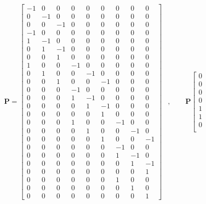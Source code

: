 \begin{align*}
   \begin{array}{ll}	
	\mathbf{P} = \left[ \begin{array}{ccccccccc}
	 -1 & 0 & 0 & 0 & 0 & 0 & 0 & 0 & 0 \\
	 0 & -1 & 0 & 0 & 0 & 0 & 0 & 0 & 0 \\	 
	 0 & 0 & -1 & 0 & 0 & 0 & 0 & 0 & 0 \\	 
	 -1 & 0 & 0 & 0 & 0 & 0 & 0 & 0 & 0 \\	 
	 1 & -1 & 0 & 0 & 0 & 0 & 0 & 0 & 0 \\	 
	 0 & 1 & -1 & 0 & 0 & 0 & 0 & 0 & 0 \\	 
	 0 & 0 & 1 & 0 & 0 & 0 & 0 & 0 & 0 \\	 
	 1 & 0 & 0 & -1 & 0 & 0 & 0 & 0 & 0 \\	 
	 0 & 1 & 0 & 0 & -1 & 0 & 0 & 0 & 0 \\	 
	 0 & 0 & 1 & 0 & 0 & -1 & 0 & 0 & 0 \\	 
	 0 & 0 & 0 & -1 & 0 & 0 & 0 & 0 & 0 \\	 
	 0 & 0 & 0 & 1 & -1 & 0 & 0 & 0 & 0 \\	 
	 0 & 0 & 0 & 0 & 1 & -1 & 0 & 0 & 0 \\	 
	 0 & 0 & 0 & 0 & 0 & 1 & 0 & 0 & 0 \\	 
	 0 & 0 & 0 & 1 & 0 & 0 & -1 & 0 & 0 \\	 
	 0 & 0 & 0 & 0 & 1 & 0 & 0 & -1 & 0 \\	 
	 0 & 0 & 0 & 0 & 0 & 1 & 0 & 0 & -1 \\	 
	 0 & 0 & 0 & 0 & 0 & 0 & -1 & 0 & 0 \\	 
	 0 & 0 & 0 & 0 & 0 & 0 & 1 & -1 & 0 \\	 
	 0 & 0 & 0 & 0 & 0 & 0 & 0 & 1 & -1 \\	 
	 0 & 0 & 0 & 0 & 0 & 0 & 0 & 0 & 1 \\	 
	 0 & 0 & 0 & 0 & 0 & 0 & 1 & 0 & 0 \\	 
	 0 & 0 & 0 & 0 & 0 & 0 & 0 & 1 & 0 \\	 
	 0 & 0 & 0 & 0 & 0 & 0 & 0 & 0 & 1	 	 	 	 	 	 	 		\end{array}\right] &, \qquad
	\mathbf{P} \left[ \begin{array}{l}
					0\\
					0\\
					0\\
					0\\
					1\\
					1\\
					0\\

\end{array}
\end{array}
\end{align*}
